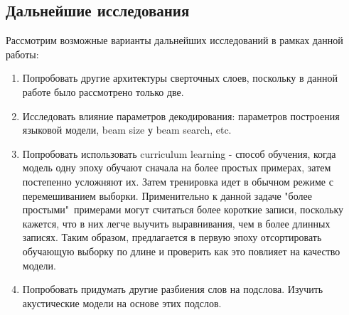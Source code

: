\documentclass[a4paper,14pt]{extarticle}
\begin{document}
\subsection{Дальнейшие исследования}
Рассмотрим возможные варианты дальнейших исследований в рамках данной работы:
\begin{enumerate}
	\item Попробовать другие архитектуры сверточных слоев, поскольку в данной работе было рассмотрено только две.
	\item Исследовать влияние параметров декодирования: параметров построения языковой модели, beam size у beam search, etc.
	\item Попробовать использовать curriculum learning - способ обучения, когда модель одну эпоху обучают сначала на более простых примерах, затем постепенно усложняют их. Затем тренировка идет в обычном режиме с перемешиванием выборки. 
	Применительно к данной задаче "более простыми"\ примерами могут считаться более короткие записи, поскольку кажется, что в них легче выучить выравнивания, чем в более длинных записях. Таким образом, предлагается в первую эпоху отсортировать обучающую выборку по длине и проверить как это повлияет на качество модели.
	\item Попробовать придумать другие разбиения слов на подслова. Изучить акустические модели на основе этих подслов.
\end{enumerate}
\pagebreak
{}

\end{document}
